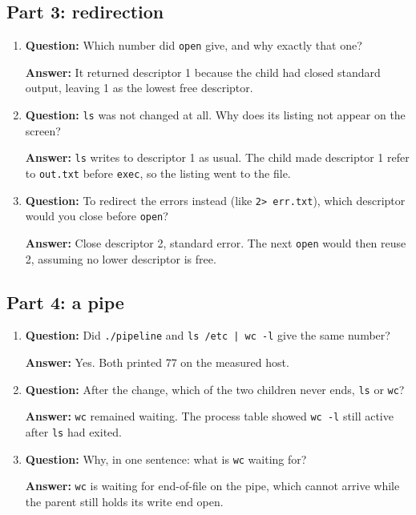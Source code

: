 \documentclass[12pt]{article}
\begin{document}
\subsection{Part 3: redirection}
\begin{enumerate}
\item \textbf{Question:} Which number did \texttt{open} give, and why exactly that one?
\par\textbf{Answer:} It returned descriptor 1 because the child had closed standard output, leaving 1 as the lowest free descriptor.

\item \textbf{Question:} \texttt{ls} was not changed at all. Why does its listing not appear on the screen?
\par\textbf{Answer:} \texttt{ls} writes to descriptor 1 as usual. The child made descriptor 1 refer to \texttt{out.txt} before \texttt{exec}, so the listing went to the file.

\item \textbf{Question:} To redirect the errors instead (like \texttt{2> err.txt}), which descriptor would you close before \texttt{open}?
\par\textbf{Answer:} Close descriptor 2, standard error. The next \texttt{open} would then reuse 2, assuming no lower descriptor is free.
\end{enumerate}

\subsection{Part 4: a pipe}
\begin{enumerate}
\item \textbf{Question:} Did \texttt{./pipeline} and \texttt{ls /etc | wc -l} give the same number?
\par\textbf{Answer:} Yes. Both printed 77 on the measured host.

\item \textbf{Question:} After the change, which of the two children never ends, \texttt{ls} or \texttt{wc}?
\par\textbf{Answer:} \texttt{wc} remained waiting. The process table showed \texttt{wc -l} still active after \texttt{ls} had exited.

\item \textbf{Question:} Why, in one sentence: what is \texttt{wc} waiting for?
\par\textbf{Answer:} \texttt{wc} is waiting for end-of-file on the pipe, which cannot arrive while the parent still holds its write end open.
\end{enumerate}
\end{document}
